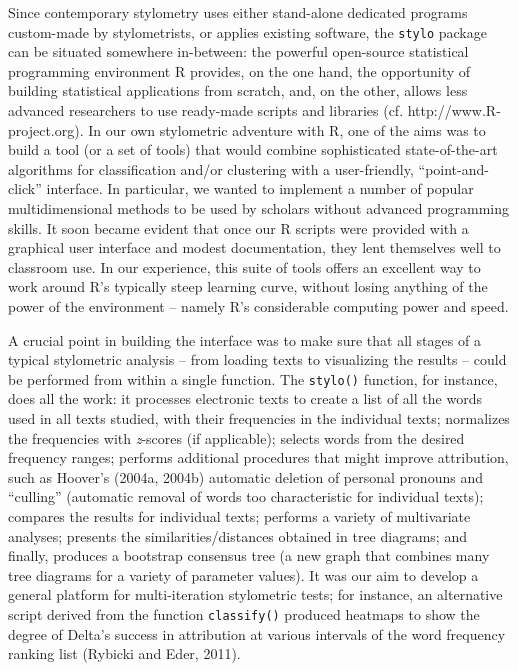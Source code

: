 \documentclass[11pt,a4paper]{article}
\def\code#1{{\tt #1}}
\begin{document}
Since contemporary stylometry uses either stand-alone dedicated programs
custom-made by stylometrists, or applies existing software, the \code{stylo}
package can be situated somewhere in-between: the powerful open-source
statistical programming environment R provides, on the one hand, the
opportunity of building statistical applications from scratch, and,
on the other, allows less advanced researchers to use ready-made scripts
and libraries (cf. http://www.R-project.org). 
In our own stylometric adventure with R, one of the
aims was to build a tool (or a set of tools) that would combine sophisticated
state-of-the-art algorithms for classification and/or clustering with
a user-friendly, ``point-and-click'' interface. In particular, we wanted
to implement a number of popular multidimensional methods to be used
by scholars without advanced programming skills. It soon became evident
that once our R scripts were provided with a graphical user interface
and modest documentation, they lent themselves well to classroom use.
In our experience, this suite of tools offers an excellent way to
work around R's typically steep learning curve, without losing anything
of the power of the environment -- namely R's considerable computing
power and speed.

A crucial point in building the interface was to make sure that all
stages of a typical stylometric analysis -- from loading texts to
visualizing the results -- could be performed from within a single
function. The \code{stylo()} function, for instance, does all the
work: it processes electronic texts to create a list of all the words
used in all texts studied, with their frequencies in the individual
texts; normalizes the frequencies with \textit{z}-scores (if applicable);
selects words from the desired frequency ranges; performs additional
procedures that might improve attribution, such as Hoover's (2004a,
2004b) automatic deletion of personal pronouns and ``culling'' (automatic
removal of words too characteristic for individual texts); compares
the results for individual texts; performs a variety of multivariate
analyses; presents the similarities/distances obtained in tree diagrams;
and finally, produces a bootstrap consensus tree (a new graph that
combines many tree diagrams for a variety of parameter values). It
was our aim to develop a general platform for multi-iteration stylometric
tests; for instance, an alternative script derived from the function
\code{classify()} produced heatmaps to show the degree of Delta's
success in attribution at various intervals of the word frequency
ranking list (Rybicki and Eder, 2011).
\end{document}
